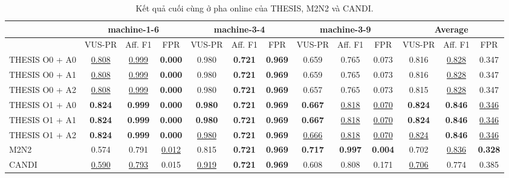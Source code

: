 \begin{table}[htbp]
\centering
\caption{Kết quả cuối cùng ở pha online của THESIS, M2N2 và CANDI.}
\label{tab:online-phase-table-3-final}
\scriptsize
\setlength{\tabcolsep}{2.5pt}
\begin{adjustbox}{max width=\textwidth}
\begin{tabular}{lcccccccccccc}
\toprule
\multirow{2}{*}{{}} & \multicolumn{3}{c}{machine-1-6} & \multicolumn{3}{c}{machine-3-4} & \multicolumn{3}{c}{machine-3-9} & \multicolumn{3}{c}{Average} \\
\midrule
{} & VUS-PR & Aff. F1 & FPR & VUS-PR & Aff. F1 & FPR & VUS-PR & Aff. F1 & FPR & VUS-PR & Aff. F1 & FPR \\
THESIS O0 + A0 & \underline{0.808} & \underline{0.999} & \textbf{0.000} & 0.980 & \textbf{0.721} & \textbf{0.969} & 0.659 & 0.765 & 0.073 & 0.816 & \underline{0.828} & 0.347 \\
THESIS O0 + A1 & \underline{0.808} & \underline{0.999} & \textbf{0.000} & 0.980 & \textbf{0.721} & \textbf{0.969} & 0.659 & 0.765 & 0.073 & 0.816 & \underline{0.828} & 0.347 \\
THESIS O0 + A2 & \underline{0.808} & \underline{0.999} & \textbf{0.000} & 0.980 & \textbf{0.721} & \textbf{0.969} & 0.657 & 0.765 & 0.073 & 0.815 & \underline{0.828} & 0.347 \\
THESIS O1 + A0 & \textbf{0.824} & \textbf{0.999} & \textbf{0.000} & \textbf{0.980} & \textbf{0.721} & \textbf{0.969} & \textbf{0.667} & \underline{0.818} & \underline{0.070} & \textbf{0.824} & \textbf{0.846} & \underline{0.346} \\
THESIS O1 + A1 & \textbf{0.824} & \textbf{0.999} & \textbf{0.000} & \textbf{0.980} & \textbf{0.721} & \textbf{0.969} & \textbf{0.667} & \underline{0.818} & \underline{0.070} & \textbf{0.824} & \textbf{0.846} & \underline{0.346} \\
THESIS O1 + A2 & \textbf{0.824} & \textbf{0.999} & \textbf{0.000} & \underline{0.980} & \textbf{0.721} & \textbf{0.969} & \underline{0.666} & \underline{0.818} & \underline{0.070} & \underline{0.824} & \textbf{0.846} & \underline{0.346} \\
M2N2 & 0.574 & 0.791 & \underline{0.012} & 0.815 & \textbf{0.721} & \textbf{0.969} & \textbf{0.717} & \textbf{0.997} & \textbf{0.004} & 0.702 & \underline{0.836} & \textbf{0.328} \\
CANDI & \underline{0.590} & \underline{0.793} & 0.015 & \underline{0.919} & \textbf{0.721} & \textbf{0.969} & 0.608 & 0.808 & 0.171 & \underline{0.706} & 0.774 & 0.385 \\
\bottomrule
\end{tabular}
\end{adjustbox}
\end{table}

